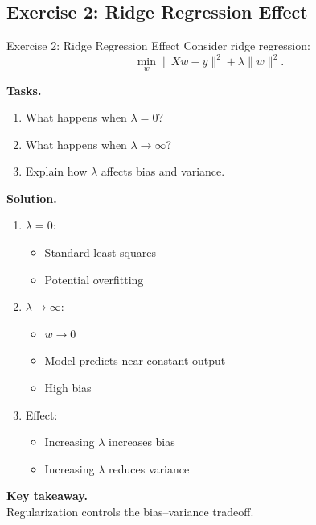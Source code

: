 \documentclass[aspectratio=169,11pt]{beamer}
\begin{document}
\subsection{Exercise 2: Ridge Regression Effect}
\begin{frame}[t,allowframebreaks]{Exercise 2: Ridge Regression Effect}
\small
Consider ridge regression:
\[
\min_w \|Xw - y\|^2 + \lambda \|w\|^2.
\]

\textbf{Tasks.}\\ \begin{enumerate}
    \item What happens when $\lambda = 0$?
    \item What happens when $\lambda \to \infty$?
    \item Explain how $\lambda$ affects bias and variance.
\end{enumerate}

\textbf{Solution.}\\ \begin{enumerate}
\item $\lambda = 0$:
\begin{itemize}
    \item Standard least squares
    \item Potential overfitting
\end{itemize}

\item $\lambda \to \infty$:
\begin{itemize}
    \item $w \to 0$
    \item Model predicts near-constant output
    \item High bias
\end{itemize}

\item Effect:
\begin{itemize}
    \item Increasing $\lambda$ increases bias
    \item Increasing $\lambda$ reduces variance
\end{itemize}
\end{enumerate}

\textbf{Key takeaway.}\\ Regularization controls the bias–variance tradeoff.
\end{frame}
\end{document}
